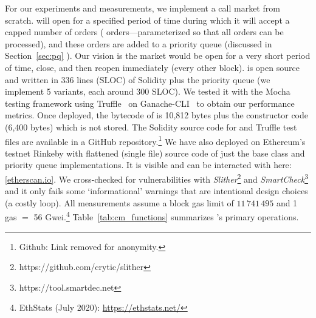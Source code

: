 For our experiments and measurements, we implement a call market from scratch. \cm will open for a specified period of time during which it will accept a capped number of orders ( orders---parameterized so that all orders can be processed), and these orders are added to a priority queue (discussed in Section~\ref{sec:pq} ). Our vision is the market would be open for a very short period of time, close, and then reopen immediately (\eg every other block). \cm is open source and written in 336 lines (SLOC) of Solidity plus the priority queue (\eg we implement 5 variants, each around 300 SLOC). We tested it with the Mocha testing framework using Truffle~\cite{TruffleO71:online} on Ganache-CLI~\cite{GanacheT25:online} to obtain our performance metrics. Once deployed, the bytecode of \cm is 10,812 bytes plus the constructor code (6,400 bytes) which is not stored. The Solidity source code for \cm and Truffle test files are available in a GitHub repository.\footnote{Github: Link removed for anonymity.} We have also deployed \cm on Ethereum's testnet Rinkeby with flattened (single file) source code of just the \cm base class and priority queue implementations. It is visible and can be interacted with here: \href{https://rinkeby.etherscan.io/address/0x0d91de29c531d074853a5cef7cf9dfeb9c6ec4e0}{[etherscan.io]}. We cross-checked for vulnerabilities with \textit{Slither}\footnote{https://github.com/crytic/slither} and \textit{SmartCheck}\footnote{https://tool.smartdec.net} and it only fails some `informational' warnings that are intentional design choices (\eg a costly loop). All measurements assume a block gas limit of $11\,741\,495$ and 1 gas $=$ 56 Gwei.\footnote{EthStats (July 2020): \url{https://ethstats.net/}} Table~\ref{tab:cm_functions} summarizes \cm's primary operations.\



%
%

